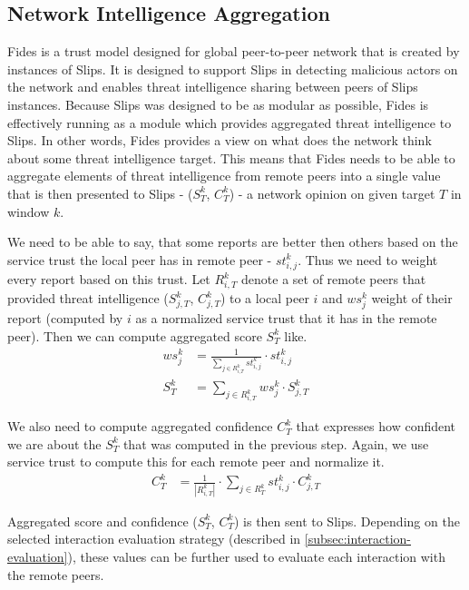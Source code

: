 \subsection{Network Intelligence Aggregation}
Fides is a trust model designed for global peer-to-peer network that is created by instances of Slips.
It is designed to support Slips in detecting malicious actors on the network and enables threat intelligence sharing between peers of Slips instances.
Because Slips was designed to be as modular as possible, Fides is effectively running as a module which provides aggregated threat intelligence to Slips. 
In other words, Fides provides a view on what does the network think about some threat intelligence target.
This means that Fides needs to be able to aggregate elements of threat intelligence from remote peers into a single value that is then presented to Slips - ($S^{k}_{T}$, $C^{k}_{T}$) - a network opinion on given target $T$ in window $k$.

We need to be able to say, that some reports are better then others based on the service trust the local peer has in remote peer - $st^{k}_{i, j}$.
Thus we need to weight every report based on this trust.
Let $R^{k}_{i, T}$ denote a set of remote peers that provided threat intelligence ($S^{k}_{j, T}$, $C^{k}_{j, T}$) to a local peer $i$ and $ws^{k}_{j}$ weight of their report (computed by $i$ as a normalized service trust that it has in the remote peer).
Then we can compute aggregated score $S^{k}_{T}$ like.
\begin{equation}
\begin{split}
    ws^{k}_{j} &= \frac{1}{\sum_{{j}\in R^{k}_{i, T}} st^{k}_{i, j}} \cdot st^{k}_{i, j} \\
    S^{k}_{T} &= \sum_{{j}\in R^{k}_{i, T}} ws^{k}_{j} \cdot S^{k}_{j, T}
\end{split}
\end{equation}

We also need to compute aggregated confidence $C^{k}_{T}$ that expresses how confident we are about the $S^{k}_{T}$ that was computed in the previous step.
Again, we use service trust to compute this for each remote peer and normalize it. 
\begin{equation}
\begin{split}
    C^{k}_{T} &= \frac{1}{|R^{k}_{i, T}|} \cdot \sum_{{j}\in R^{k}_{T}} st^{k}_{i, j} \cdot C^{k}_{j, T}
\end{split}
\end{equation}

\noindent 
Aggregated score and confidence ($S^{k}_{T}$, $C^{k}_{T}$) is then sent to Slips.
Depending on the selected interaction evaluation strategy (described in \ref{subsec:interaction-evaluation}), these values can be further used to evaluate each interaction with the remote peers.
